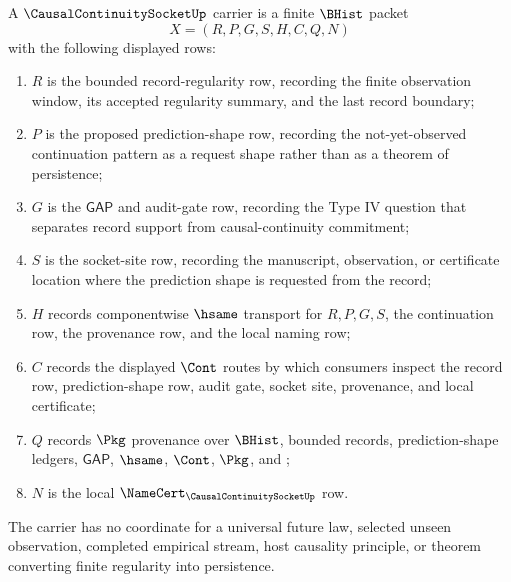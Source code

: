 \begin{definition}
\label{def:causal-continuity-socket-carrier}
A $\CausalContinuitySocketUp$ carrier is a finite $\BHist$ packet
$$
X=(R,P,G,S,H,C,Q,N)
$$
with the following displayed rows:
\begin{enumerate}
\item $R$ is the bounded record-regularity row, recording the finite observation window, its accepted regularity summary, and the last record boundary;
\item $P$ is the proposed prediction-shape row, recording the not-yet-observed continuation pattern as a request shape rather than as a theorem of persistence;
\item $G$ is the $\mathsf{GAP}$ and audit-gate row, recording the Type IV question that separates record support from causal-continuity commitment;
\item $S$ is the socket-site row, recording the manuscript, observation, or certificate location where the prediction shape is requested from the record;
\item $H$ records componentwise $\hsame$ transport for $R,P,G,S$, the continuation row, the provenance row, and the local naming row;
\item $C$ records the displayed $\Cont$ routes by which consumers inspect the record row, prediction-shape row, audit gate, socket site, provenance, and local certificate;
\item $Q$ records $\Pkg$ provenance over $\BHist$, bounded records, prediction-shape ledgers, $\mathsf{GAP}$, $\hsame$, $\Cont$, $\Pkg$, and \NameCert{};
\item $N$ is the local $\NameCert_{\CausalContinuitySocketUp}$ row.
\end{enumerate}
The carrier has no coordinate for a universal future law, selected unseen observation, completed empirical stream, host causality principle, or theorem converting finite regularity into persistence.
\end{definition}

